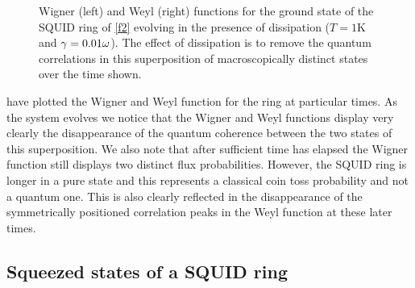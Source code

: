 \documentclass[twocolumn,a4paper,superscriptaddress,showpacs,floatfix,pra]{revtex4}
\begin{document}
\begin{figure}[!t]
\begin{center}
\end{center}
\caption{Wigner (left)  and Weyl  (right) functions  for  the ground
state of the  SQUID ring of \protect\ref{f2} evolving  in the presence
of dissipation ($T=1$K and $\protect\gamma =0.01\protect\omega $). The
effect of  dissipation is  to remove the  quantum correlations  in this superposition of macroscopically distinct states over the time shown. }
\label{f5}
\end{figure}
have plotted the  Wigner and Weyl function for  the ring at particular
times.   As the  system evolves  we notice  that the  Wigner  and Weyl
functions  display  very  clearly  the disappearance  of  the  quantum
coherence between the  two states of this superposition.  We also note
that  after sufficient  time  has elapsed  the  Wigner function  still
displays two distinct flux  probabilities.  However, the SQUID ring is
longer  in a  pure state  and this  represents a  classical  coin toss
probability and not  a quantum one. This is  also clearly reflected in
the disappearance of the symmetrically positioned correlation peaks in
the Weyl function at these later times.

\subsection*{Squeezed states of a SQUID ring}
\end{document}
